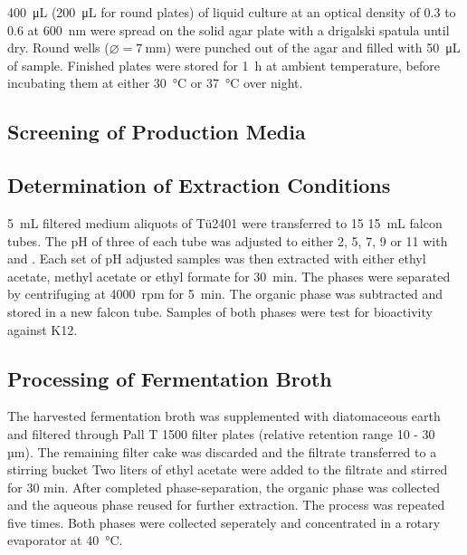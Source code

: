 	\SI{400}{\micro\liter} (\SI{200}{\micro\liter} for round plates) of liquid culture at an optical density of 0.3 to 0.6 at \SI{600}{\nano\meter} were spread on the solid agar plate with a drigalski spatula until dry. Round wells ($\varnothing=\SI{7}{\milli\meter}$) were punched out of the agar and filled with \SI{50}{\micro\liter} of sample. Finished plates were stored for \SI{1}{\hour} at ambient temperature, before incubating them at either \SI{30}{\celsius} or \SI{37}{\celsius} over night.

	

	\subsection{Screening of Production Media} %
	\label{sub:screening_of_production_media}
	



	\subsection{Determination of Extraction Conditions} %
	\label{sub:determination_of_extraction_conditions}

	\SI{5}{\milli\liter} filtered medium aliquots of Tü2401 were transferred to 15 \SI{15}{\milli\liter} falcon tubes. The pH of three of each tube was adjusted to either 2, 5, 7, 9 or 11 with  and . Each set of pH adjusted samples was then extracted with either ethyl acetate, methyl acetate or ethyl formate for \SI{30}{\minute}. The phases were separated by centrifuging at 4000~rpm for \SI{5}{\minute}. The organic phase was subtracted and stored in a new falcon tube. Samples of both phases were test for bioactivity against K12.
	

	\subsection{Processing of Fermentation Broth} %
	\label{sub:processing_of_fermentation_broth}
	The harvested fermentation broth was supplemented with diatomaceous earth and filtered through Pall T 1500 filter plates (relative retention range 10 - 30 µm). The remaining filter cake was discarded and the filtrate transferred to a stirring bucket %
	Two liters of ethyl acetate were added to the filtrate and stirred for 30 min. After completed phase-separation, the organic phase was collected and the aqueous phase reused for further extraction. The process was repeated five times. Both phases were collected seperately and concentrated in a rotary evaporator at \SI{40}{\celsius}.

